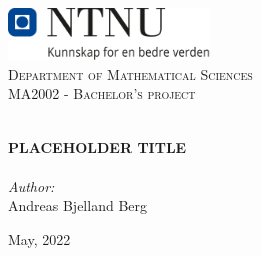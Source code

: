 
\begin{titlepage}
\vbox{ }
\vbox{ }
\begin{center}
\includegraphics[width=0.40\textwidth]{Images/NTNU_logo.png}\\[1cm]
\textsc{\LARGE Department of Mathematical Sciences}\\[1.5cm]
\textsc{\Large MA2002 - Bachelor's project}\\[0.5cm]
\vbox{ }

\HRule \\[0.4cm]
{ \huge \bfseries \color{red}PLACEHOLDER TITLE}\\[0.4cm]
\HRule \\[1.5cm]

\large
\emph{Author:}\\
Andreas Bjelland Berg
\vfill

{\large May, 2022}
\end{center}
\end{titlepage}